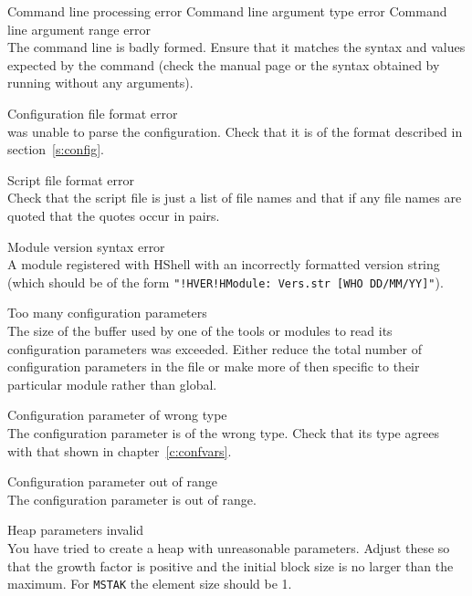 \begin{itemize}

\begin{itemize}
    Command line processing error
    Command line argument type error
    Command line argument range error\\
        The command line is badly formed.  Ensure that it matches the 
        syntax and values expected by the command (check the manual 
        page or the syntax obtained by running  without any
        arguments).

    Configuration file format error\\
         was unable to parse the configuration. Check that
        it is of the format described in section~\ref{s:config}.

    Script file format error\\
        Check that the script file is just a list of file names and that
        if any file names are quoted that the quotes occur in pairs.

    Module version syntax error\\
        A module registered with HShell with an incorrectly formatted
        version string (which should be of the form
        \texttt{"!HVER!HModule: Vers.str [WHO DD/MM/YY]"}).

    Too many configuration parameters\\
        The size of the buffer used by one of the tools or modules to read
        its configuration parameters was exceeded.  Either reduce the total
        number of configuration parameters in the file or make more of then
        specific to their particular module rather than global.

    Configuration parameter of wrong type\\
        The configuration parameter is of the wrong type.  Check that its type 
        agrees with that shown in chapter~\ref{c:confvars}.

    Configuration parameter out of range\\
        The configuration parameter is out of range.  

\end{itemize}


\begin{itemize}
    Heap parameters invalid\\
        You have tried to create a heap with unreasonable parameters.  Adjust 
        these so that the growth factor is positive and the initial block 
        size is no larger than the maximum.  For \texttt{MSTAK} the element 
        size should be 1.


\end{itemize}
\end{itemize}
